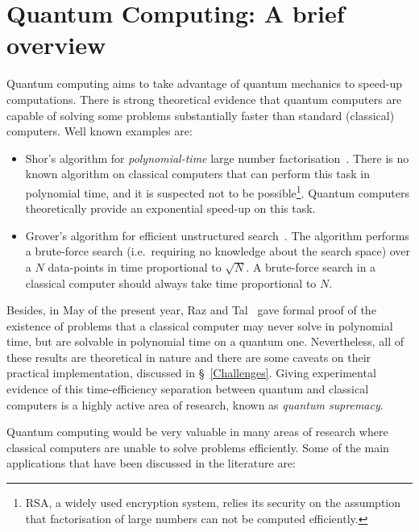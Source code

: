 \chapter{Quantum Computing: A brief overview}

Quantum computing aims to take advantage of quantum mechanics to speed-up computations. There is strong theoretical evidence that quantum computers are capable of solving some problems substantially faster than standard (classical) computers. Well known examples are:

\begin{itemize} 
  \item Shor's algorithm for \textit{polynomial-time} large number factorisation~\citep{Shor}. There is no known algorithm on classical computers that can perform this task in polynomial time, and it is suspected not to be possible\footnote{RSA, a widely used encryption system, relies its security on the assumption that factorisation of large numbers can not be computed efficiently.}. Quantum computers theoretically provide an exponential speed-up on this task.
  \item Grover's algorithm for efficient unstructured search~\citep{Grover}. The algorithm performs a brute-force search (i.e.\ requiring no knowledge about the search space) over a \(N\) data-points in time proportional to \(\sqrt{N}\). A brute-force search in a classical computer should always take time proportional to \(N\).
\end{itemize}

Besides, in May of the present year, Raz and Tal~\citep{BQPSepPH} gave formal proof of the existence of problems that a classical computer may never solve in polynomial time, but are solvable in polynomial time on a quantum one. Nevertheless, all of these results are theoretical in nature and there are some caveats on their practical implementation, discussed in \S~\ref{Challenges}. Giving experimental evidence of this time-efficiency separation between quantum and classical computers is a highly active area of research, known as \textit{quantum supremacy}. 

Quantum computing would be very valuable in many areas of research where classical computers are unable to solve problems efficiently. Some of the main applications that have been discussed in the literature are:

